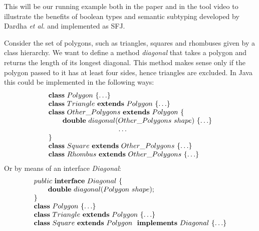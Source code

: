\documentclass[runningheads]{llncs}
\begin{document}
\begin{example}[Polygons]
    \label{polygons}
    This will be our running example both in the paper and in the tool video \cite{UD20} to illustrate the benefits of boolean types and semantic subtyping developed by Dardha \emph{et al.} \cite{Dardha2013,Dardha2017} and implemented as SFJ.

    Consider the set of polygons, such as triangles, squares and rhombuses given by a class hierarchy.
    We want to define a method \emph{diagonal} that takes a polygon and returns the length of its longest diagonal.
    This method makes sense only if the polygon passed to it has at least four sides, hence triangles are excluded.
    In Java this could be implemented in the following ways:
    \begin{equation*}
        \begin{array}{l}
            \synclass Polygon \ \{ \ldots\}
            \\
            \syndecl{Triangle}{Polygon} {\ldots}
            \\
            \syndecl{Other\_Polygons}{Polygon} {
                \\
                \qquad \mathbf{double}\ diagonal(Other\_Polygons \ shape)\ \{\ldots \}
                \\
                \hspace{3.5cm} \ldots
                \\
            }
            \\
            \syndecl{Square}{Other\_Polygons}{\ldots}
            \\
            \syndecl{Rhombus}{Other\_Polygons} {\ldots}
        \end{array}
    \end{equation*}
    Or by means of an interface \emph{Diagonal}:
    \begin{equation*}
        \begin{array}{l}
            public \ \mathbf{interface} \  Diagonal\ \{
            \\
            \qquad \mathbf{double}\ diagonal(Polygon \ shape);
            \\
            \}
            \\
            \mathbf{class} \  Polygon \ \{\ldots\}
            \\
            \mathbf{class} \  Triangle \ \mathbf{extends }\  Polygon\ \{\ldots\}
            \\
            \mathbf{class} \  Square \ \mathbf{extends }\  Polygon\  \ \mathbf{implements}\  Diagonal \ \{\ldots\}
            \\

\end{array}
\end{equation*}
\end{example}
\end{document}
